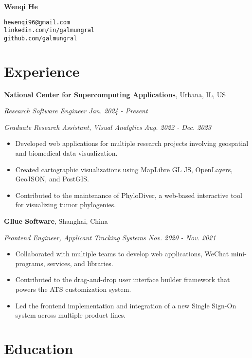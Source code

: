\documentclass[11pt]{article}
\begin{document}
 

{\Huge\bf Wenqi He}

\vspace{10pt}
\texttt{hewenqi96@gmail.com}\\
\texttt{linkedin.com/in/galmungral}\\
\texttt{github.com/galmungral}\\

\section*{\sc Experience}

\vspace{1em}
\textbf{National Center for Supercomputing Applications}, Urbana, IL, US

\textit{Research Software Engineer \hfill Jan. 2024 - Present}

\textit{Graduate Research Assistant, Visual Analytics \hfill Aug. 2022 - Dec. 2023}

\begin{itemize}
\item Developed web applications for multiple research projects involving geospatial and biomedical data visualization.
\item Created cartographic visualizations using MapLibre GL JS, OpenLayers, GeoJSON, and PostGIS.
\item Contributed to the maintenance of PhyloDiver, a web-based interactive tool for visualizing tumor phylogenies.
\end{itemize}

\vspace{1em}
\textbf{Gllue Software}, Shanghai, China

\textit{Frontend Engineer, Applicant Tracking Systems \hfill Nov. 2020 - Nov. 2021}

\begin{itemize}
\item Collaborated with multiple teams to develop web applications, WeChat mini-programs, services, and libraries.
\item Contributed to the drag-and-drop user interface builder framework that powers the ATS customization system.
\item Led the frontend implementation and integration of a new Single Sign-On system across multiple product lines.
\end{itemize}

\section*{\sc Education}
\end{document}
